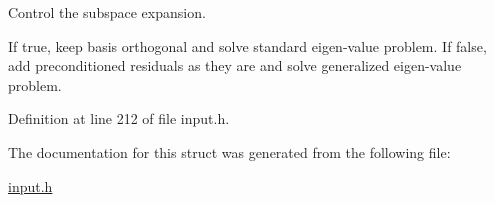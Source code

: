 Control the subspace expansion. 

If true, keep basis orthogonal and solve standard eigen-\/value problem. If false, add preconditioned residuals as they are and solve generalized eigen-\/value problem. 

Definition at line 212 of file input.\+h.



The documentation for this struct was generated from the following file\+:\begin{DoxyCompactItemize}
\item 
\hyperlink{input_8h}{input.\+h}\end{DoxyCompactItemize}
